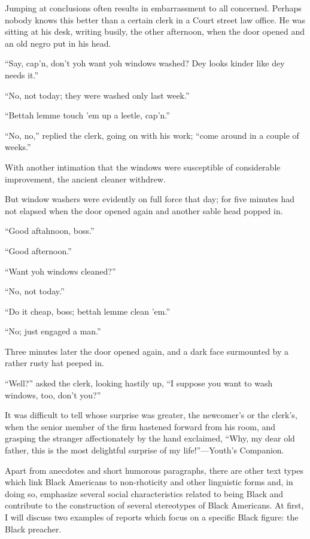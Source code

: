 \begin{ipquote}
\begin{center}
\end{center}
Jumping at conclusions often results in embarrassment to all concerned. Perhaps nobody knows this better than a certain clerk in a Court street law office. He was sitting at his desk, writing busily, the other afternoon, when the door opened and an old negro put in his head.

“Say, cap’n, don’t yoh want yoh windows washed? Dey looks kinder like dey needs it.”

“No, not today; they were washed only last week.”

“Bettah lemme touch ’em up a leetle, cap’n.”

“No, no,” replied the clerk, going on with his work; “come around in a couple of weeks.”

With another intimation that the windows were susceptible of considerable improvement, the ancient cleaner withdrew.

But window washers were evidently on full force that day; for five minutes had not elapsed when the door opened again and another sable head popped in.

“Good aftahnoon, boss.”

“Good afternoon.”

“Want yoh windows cleaned?”

“No, not today.”

“Do it cheap, boss; bettah lemme clean ’em.”

“No; just engaged a man.”

 Three minutes later the door opened again, and a dark face surmounted by a rather rusty hat peeped in.

“Well?” asked the clerk, looking hastily up, “I suppose you want to wash windows, too, don’t you?”

It was difficult to tell whose surprise was greater, the newcomer’s or the clerk’s, when the senior member of the firm hastened forward from his room, and grasping the stranger affectionately by the hand exclaimed, “Why, my dear old father, this is the most delightful surprise of my life!”—Youth’s Companion.
\end{ipquote}

Apart from anecdotes and short humorous paragraphs, there are other text types which link Black Americans to non-rhoticity and other linguistic forms and, in doing so, emphasize several social characteristics related to being Black and contribute to the construction of several stereotypes of Black Americans. At first, I will discuss two examples of reports which focus on a specific Black figure: the Black preacher.

